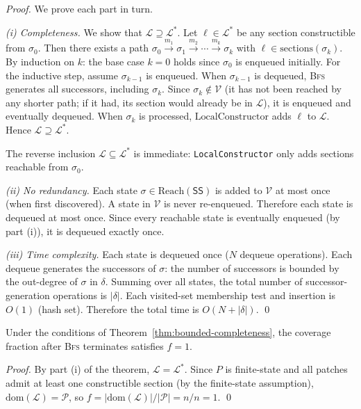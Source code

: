 \documentclass[11pt]{article}
\newcommand{\state}{\sigma}                   %
\newcommand{\visited}{\mathcal{V}}            %
\newcommand{\Trans}{\delta}                   %
\newcommand{\reach}{\mathrm{Reach}}           %
\newcommand{\BFS}{\textsc{Bfs}}
\newcommand{\LocalSec}{\ell}                  %
\newcommand{\patchset}{\mathcal{P}}           %
\newcommand{\covfrac}{f}                      %
\begin{document}
\begin{proof}
We prove each part in turn.

\smallskip\noindent
\emph{(i) Completeness.}
We show that $\mathcal{L} \supseteq \mathcal{L}^*$.  Let
$\LocalSec \in \mathcal{L}^*$ be any section constructible from
$\state_0$.  Then there exists a path $\state_0 \xrightarrow{m_1}
\state_1 \xrightarrow{m_2} \cdots \xrightarrow{m_k} \state_k$ with
$\LocalSec \in \mathrm{sections}(\state_k)$.  By induction on $k$:
the base case $k=0$ holds since $\state_0$ is enqueued initially.
For the inductive step, assume $\state_{k-1}$ is enqueued.  When
$\state_{k-1}$ is dequeued, \BFS{} generates all successors, including
$\state_k$.  Since $\state_k \notin \visited$ (it has not been reached
by any shorter path; if it had, its section would already be in
$\mathcal{L}$), it is enqueued and eventually dequeued.  When
$\state_k$ is processed, $\mathrm{LocalConstructor}$ adds $\LocalSec$
to $\mathcal{L}$.  Hence $\mathcal{L} \supseteq \mathcal{L}^*$.

The reverse inclusion $\mathcal{L} \subseteq \mathcal{L}^*$ is
immediate: \texttt{LocalConstructor} only adds sections reachable from
$\state_0$.

\smallskip\noindent
\emph{(ii) No redundancy.}
Each state $\state \in \reach(\mathsf{SS})$ is added to $\visited$ at
most once (when first discovered).  A state in $\visited$ is never
re-enqueued.  Therefore each state is dequeued at most once.  Since
every reachable state is eventually enqueued (by part (i)), it is
dequeued exactly once.

\smallskip\noindent
\emph{(iii) Time complexity.}
Each state is dequeued once ($N$ dequeue operations).  Each dequeue
generates the successors of $\state$: the number of successors is
bounded by the out-degree of $\state$ in $\Trans$.  Summing over all
states, the total number of successor-generation operations is
$|\Trans|$.  Each visited-set membership test and insertion is $O(1)$
(hash set).  Therefore the total time is $O(N + |\Trans|)$. \qed
\end{proof}

\begin{corollary}\label{cor:bfs-coverage}
Under the conditions of Theorem~\ref{thm:bounded-completeness}, the
coverage fraction after \BFS{} terminates satisfies $\covfrac = 1$.
\end{corollary}

\begin{proof}
By part (i) of the theorem, $\mathcal{L} = \mathcal{L}^*$.  Since
$P$ is finite-state and all patches admit at least one constructible
section (by the finite-state assumption), $\mathrm{dom}(\mathcal{L})
= \patchset$, so $\covfrac = |\mathrm{dom}(\mathcal{L})| / |\patchset|
= n/n = 1$. \qed
\end{proof}
\end{document}
